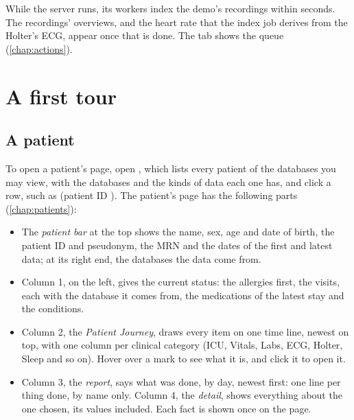 While the server runs, its workers index the demo's recordings within seconds. The recordings'
overviews, and the heart rate that the index job derives from the Holter's ECG, appear once that
is done. The  tab shows the queue (\cref{chap:actions}).

\section{A first tour}
\label{sec:quickstart-tour}

\subsection{A patient}
\label{sec:quickstart-patient}

To open a patient's page, open , which lists every patient of the
databases you may view, with the databases and the kinds of data each one has, and click a row,
such as  (patient ID ). The patient's page has the following parts (\cref{chap:patients}):
\begin{itemize}
\item The \emph{patient bar} at the top shows the name, sex, age and date of birth, the patient
  ID and pseudonym, the MRN and the dates of the first and latest data; at its right end, the
  databases the data come from.
\item Column 1, on the left, gives the current status: the allergies first, the visits, each with
  the database it comes from, the medications of the latest stay and the conditions.
\item Column 2, the \emph{Patient Journey}, draws every item on one time line, newest on
  top, with one column per clinical category (ICU, Vitals, Labs, ECG, Holter, Sleep and so on).
  Hover over a mark to see what it is, and click it to open it.
\item Column 3, the \emph{report}, says what was done, by day, newest first: one line per thing
  done, by name only. Column 4, the \emph{detail}, shows everything about the one chosen, its
  values included. Each fact is shown once on the page.
\end{itemize}

